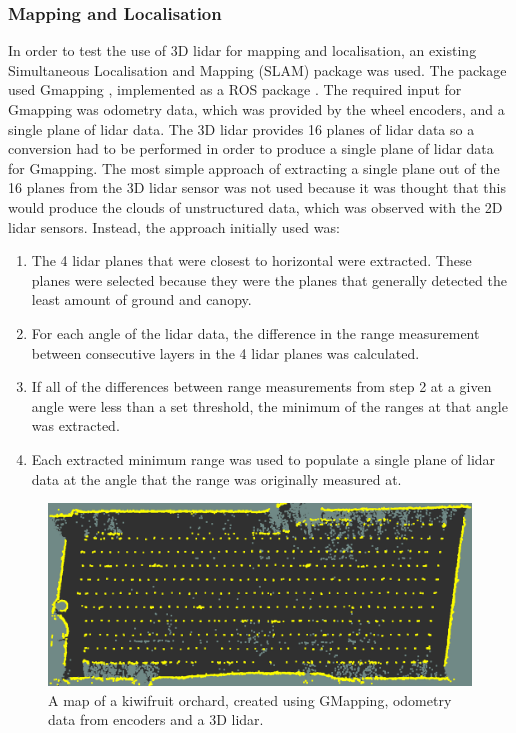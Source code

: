 \documentclass[preprint,authoryear,12pt]{elsarticle}
\begin{document}
\subsubsection{Mapping and Localisation}
    In order to test the use of 3D lidar for mapping and localisation, an existing Simultaneous Localisation and Mapping (SLAM) package was used. The package used Gmapping \citep{Grisetti2007}, implemented as a ROS package \citep{Gerkey}. The required input for Gmapping was odometry data, which was provided by the wheel encoders, and a single plane of lidar data. The 3D lidar provides 16 planes of lidar data so a conversion had to be performed in order to produce a single plane of lidar data for Gmapping. The most simple approach of extracting a single plane out of the 16 planes from the 3D lidar sensor was not used because it was thought that this would produce the clouds of unstructured data, which was observed with the 2D lidar sensors. Instead, the approach initially used was:
    \begin{enumerate}
    \item The 4 lidar planes that were closest to horizontal were extracted. These planes were selected because they were the planes that generally detected the least amount of ground and canopy.
    \item For each angle of the lidar data, the difference in the range measurement between consecutive layers in the 4 lidar planes was calculated. 
    \item If all of the differences between range measurements from step 2 at a given angle were less than a set threshold, the minimum of the ranges at that angle was extracted.
    \item Each extracted minimum range was used to populate a single plane of lidar data at the angle that the range was originally measured at.
    \end{enumerate}

    \begin{figure}[htb]
        \centering
        \includegraphics[width=\linewidth]{imgs/photos/gmapmap.png}
        \caption{
            A map of a kiwifruit orchard, created using GMapping, odometry data from encoders and a 3D lidar.
        }
        \label{fig:gmapmap}
    \end{figure}
\end{document}
